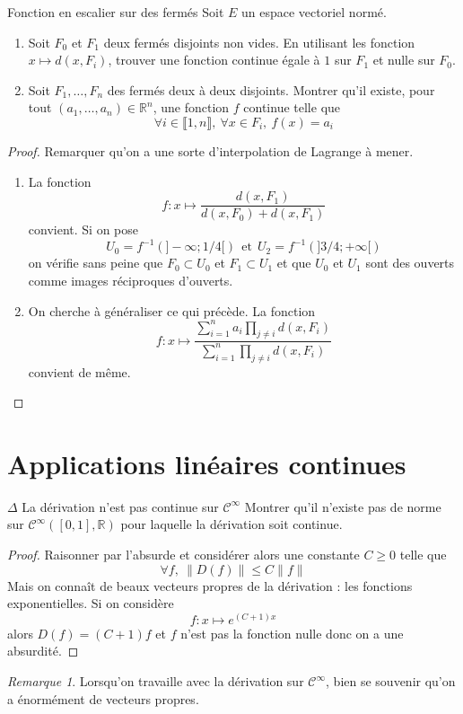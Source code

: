 \documentclass[french,a4paper]{article}
\newcommand{\R}{\mathbb{R}}
\newcommand{\inv}{^{-1}}
\theoremstyle{plain}
\theoremstyle{definition}
\theoremstyle{remark}
\newtheorem*{rmq}{Remarque}
\begin{document}
\begin{ex}[Moulin.24]{Fonction en escalier sur des fermés}
	Soit $E$ un espace vectoriel normé.
	\begin{enumerate}
		\item Soit $F_0$ et $F_1$ deux fermés disjoints non vides. En utilisant les fonction $x\mapsto d(x,F_i)$, trouver une fonction continue égale à $1$ sur $F_1$ et nulle sur $F_0$.
		\item Soit $F_1,\ldots,F_n$ des fermés deux à deux disjoints. Montrer qu'il existe, pour tout $(a_1,\ldots,a_n)\in\R^n$, une fonction $f$ continue telle que $$\forall i\in\llbracket1,n\rrbracket,\ \forall x\in F_i,\ f(x)=a_i$$
	\end{enumerate}
\end{ex}
\begin{proof}
	Remarquer qu'on a une sorte d'interpolation de Lagrange à mener.
	\begin{enumerate}
		\item La fonction $$f:x\mapsto\frac{d(x,F_1)}{d(x,F_0)+d(x,F_1)}$$ convient. Si on pose $$U_0=f\inv\left(]-\infty ;1/4[\right) \ \ \text{et} \ \ U_2=f\inv\left(]3/4;+\infty[\right)$$ on vérifie sans peine que $F_0\subset U_0$ et $F_1\subset U_1$ et que $U_0$ et $U_1$ sont des ouverts comme images réciproques d'ouverts.
		\item On cherche à généraliser ce qui précède. La fonction $$f:x\mapsto\frac{\sum_{i=1}^{n}a_i\prod_{j\ne i}d(x,F_i)}{\sum_{i=1}^{n}\prod_{j\ne i}d(x,F_i)}$$ convient de même.
	\end{enumerate}
\end{proof}

\section{Applications linéaires continues}

\begin{ex}[Moulin.25]{$\Delta$ La dérivation n'est pas continue sur $\mathcal{C}^\infty$}
	Montrer qu'il n'existe pas de norme sur $\mathcal{C}^{\infty}([0,1],\R)$ pour laquelle la dérivation soit continue.
\end{ex}
\begin{proof}
	Raisonner par l'absurde et considérer alors une constante $C\geqslant 0$ telle que $$\forall f,\ \lVert D(f)\rVert\leqslant C\lVert f\rVert$$ Mais on connaît de beaux vecteurs propres de la dérivation : les fonctions exponentielles. Si on considère $$f:x\mapsto e^{(C+1)x}$$ alors $D(f)=(C+1)f$ et $f$ n'est pas la fonction nulle donc on a une absurdité.
\end{proof}
\begin{rmq}
	Lorsqu'on travaille avec la dérivation sur $\mathcal{C}^\infty$, bien se souvenir qu'on a énormément de vecteurs propres.
\end{rmq}
\end{document}
